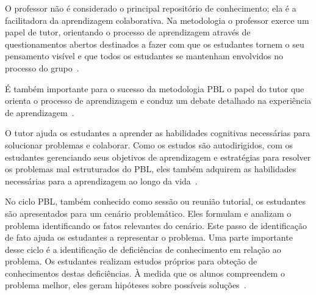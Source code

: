 


O professor não é considerado o principal repositório
de conhecimento; ela é a facilitadora da aprendizagem
colaborativa.
Na metodologia o professor exerce um papel de tutor, orientando
o processo de aprendizagem através de questionamentos abertos
destinados a fazer com que os estudantes tornem o seu pensamento
visível e que todos os estudantes se mantenham envolvidos
no processo do grupo~\cite{hmelo2004problem}.

É também importante para o sucesso da metodologia PBL o
papel do tutor que orienta o processo de aprendizagem
e conduz um debate detalhado na experiência de
aprendizagem~\cite{savery2015overview}.

O tutor ajuda os estudantes a aprender as habilidades cognitivas
necessárias para solucionar problemas e colaborar.
Como os estudos são autodirigidos, com os estudantes gerenciando
seus objetivos de aprendizagem e estratégias
para resolver os problemas mal estruturados do PBL, eles
também adquirem as habilidades necessárias para a
aprendizagem ao longo da vida~\cite{hmelo2004problem}.


No ciclo PBL, também conhecido como sessão ou reunião tutorial, os estudantes
são apresentados para um cenário problemático.
Eles formulam e analizam o problema identificando os fatos relevantes do cenário.
Este passo de identificação de fato ajuda os estudantes a representar o problema.
Uma parte importante desse ciclo é a identificação de deficiências
de conhecimento em relação ao problema.
Os estudantes realizam estudos próprios para obteção de
conhecimentos destas deficiências.
À medida que os alunos compreendem o problema melhor, eles geram
hipóteses sobre possíveis soluções~\cite{hmelo2004problem}.


